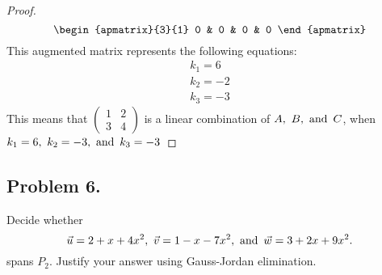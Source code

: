 \documentclass{article}
\begin{document}
\begin{proof}
\[\begin{apmatrix}{3}{1}
            0 & 0 & 0 & 0
        \end{apmatrix}
    \]
    This augmented matrix represents the following equations:
    \begin{align*}
        k_1 = 6  \\
        k_2 = -2 \\
        k_3 = -3
    \end{align*}
    This means that $\begin{pmatrix}1 & 2 \\ 3 & 4\end{pmatrix}$ is a linear combination of $A,~B,\operatorname{~\text{and}~} C$, when $k_1 = 6,~k_2 = -3, \operatorname{~\text{and}~} k_3 = -3$
\end{proof}


\newpage

\subsection*{Problem 6.}
Decide whether
\[
    \vec{u} = 2 + x + 4x^2,~\vec{v} = 1 - x - 7x^2, \operatorname{~\text{and}~} \vec{w} = 3 + 2x + 9x^2.
\]
spans $P_2$. Justify your answer using Gauss-Jordan elimination.
\end{document}
